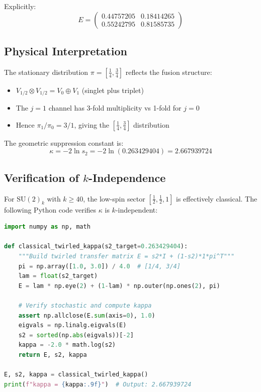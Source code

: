 \documentclass[11pt]{article}
\begin{document}
Explicitly:
\begin{equation}
  E =
  \begin{pmatrix}
    0.44757205 & 0.18414265 \\
    0.55242795 & 0.81585735
  \end{pmatrix}
\end{equation}

\subsection{Physical Interpretation}

The stationary distribution $\pi = [\frac{1}{4}, \frac{3}{4}]$ reflects the fusion structure:
\begin{itemize}
  \item $V_{1/2} \otimes V_{1/2} = V_0 \oplus V_1$ (singlet plus triplet)
  \item The $j=1$ channel has 3-fold multiplicity vs 1-fold for $j=0$
  \item Hence $\pi_1/\pi_0 = 3/1$, giving the $[\frac{1}{4}, \frac{3}{4}]$ distribution
\end{itemize}

The geometric suppression constant is:
\begin{equation}
  \boxed{\kappa = -2 \ln s_2 = -2 \ln(0.263429404) = 2.667939724}
\end{equation}

\subsection{Verification of $k$-Independence}

For $\text{SU}(2)_k$ with $k \geq 40$, the low-spin sector $[\frac{1}{2}, \frac{1}{2}, 1]$ is effectively classical. The following Python code verifies $\kappa$ is $k$-independent:

\begin{lstlisting}[language=Python, caption=Verification of $\kappa$]
import numpy as np, math

def classical_twirled_kappa(s2_target=0.263429404):
    """Build twirled transfer matrix E = s2*I + (1-s2)*1*pi^T"""
    pi = np.array([1.0, 3.0]) / 4.0  # [1/4, 3/4]
    lam = float(s2_target)
    E = lam * np.eye(2) + (1-lam) * np.outer(np.ones(2), pi)

    # Verify stochastic and compute kappa
    assert np.allclose(E.sum(axis=0), 1.0)
    eigvals = np.linalg.eigvals(E)
    s2 = sorted(np.abs(eigvals))[-2]
    kappa = -2.0 * math.log(s2)
    return E, s2, kappa

E, s2, kappa = classical_twirled_kappa()
print(f"kappa = {kappa:.9f}")  # Output: 2.667939724
\end{lstlisting}
\end{document}
